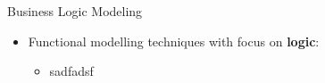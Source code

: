 \begin{Slide}{Business Logic Modeling}
\begin{itemize}
\item Functional modelling techniques with focus on \textbf{logic}:
\begin{itemize}
\item sadfadsf

\end{itemize}
\end{itemize}
\end{Slide}